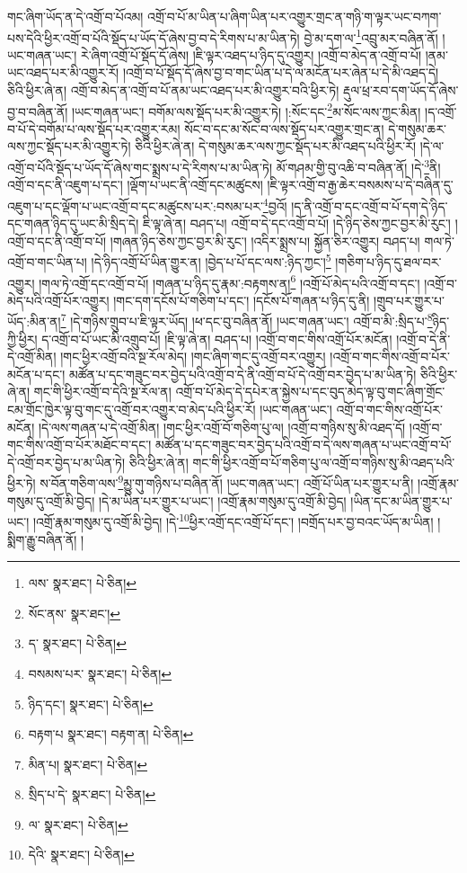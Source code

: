 གང་ཞིག་ཡོད་ན་དེ་འགྲོ་བ་པོའམ། འགྲོ་བ་པོ་མ་ཡིན་པ་ཞིག་ཡིན་པར་འགྱུར་གྲང་ན་གཉི་ག་ལྟར་ཡང་བཀག་པས་དེའི་ཕྱིར་འགྲོ་བ་པོའི་སྡོད་པ་ཡོད་དོ་ཞེས་བྱ་བ་དེ་རིགས་པ་མ་ཡིན་ཏེ། བྱེ་མ་དག་ལ་\footnote{ལས་  སྣར་ཐང་།  པེ་ཅིན། }འབྲུ་མར་བཞིན་ནོ། །ཡང་གཞན་ཡང་། རེ་ཞིག་འགྲོ་པོ་སྡོད་དོ་ཞེས། །ཇི་ལྟར་འཐད་པ་ཉིད་དུ་འགྱུར། །འགྲོ་བ་མེད་ན་འགྲོ་བ་པོ། །ནམ་ཡང་འཐད་པར་མི་འགྱུར་རོ། །འགྲོ་བ་པོ་སྡོད་དོ་ཞེས་བྱ་བ་གང་ཡིན་པ་དེ་ལ་མངོན་པར་ཞེན་པ་དེ་མི་འཐད་དེ། ཅིའི་ཕྱིར་ཞེ་ན། འགྲོ་བ་མེད་ན་འགྲོ་བ་པོ་ནམ་ཡང་འཐད་པར་མི་འགྱུར་བའི་ཕྱིར་ཏེ། རྡུལ་ཕྲ་རབ་དག་ཡོད་དོ་ཞེས་བྱ་བ་བཞིན་ནོ། །ཡང་གཞན་ཡང་། བགོམ་ལས་སྡོད་པར་མི་འགྱུར་ཏེ། །:སོང་དང་\footnote{སོང་ནས་  སྣར་ཐང་། }མ་སོང་ལས་ཀྱང་མིན། །ད་འགྲོ་བ་པོ་དེ་བགོམ་པ་ལས་སྡོད་པར་འགྱུར་རམ། སོང་བ་དང་མ་སོང་བ་ལས་སྡོད་པར་འགྱུར་གྲང་ན། དེ་གསུམ་ཆར་ལས་ཀྱང་སྡོད་པར་མི་འགྱུར་ཏེ། ཅིའི་ཕྱིར་ཞེ་ན། དེ་གསུམ་ཆར་ལས་ཀྱང་སྡོད་པར་མི་འཐད་པའི་ཕྱིར་རོ། །དེ་ལ་འགྲོ་བ་པོའི་སྡོད་པ་ཡོད་དོ་ཞེས་གང་སྨྲས་པ་དེ་རིགས་པ་མ་ཡིན་ཏེ། མོ་གཤམ་གྱི་བུ་འཆི་བ་བཞིན་ནོ། །དེ་\footnote{ད་  སྣར་ཐང་།  པེ་ཅིན། }ནི། འགྲོ་བ་དང་ནི་འཇུག་པ་དང་། །ལྡོག་པ་ཡང་ནི་འགྲོ་དང་མཚུངས། །ཇི་ལྟར་འགྲོ་བ་རྒྱ་ཆེར་བསམས་པ་དེ་བཞིན་དུ་འཇུག་པ་དང་ལྡོག་པ་ཡང་འགྲོ་བ་དང་མཚུངས་པར་:བསམ་པར་\footnote{བསམས་པར་  སྣར་ཐང་།  པེ་ཅིན། }བྱའོ། །ད་ནི་འགྲོ་བ་དང་འགྲོ་བ་པོ་དག་དེ་ཉིད་དང་གཞན་ཉིད་དུ་ཡང་མི་སྲིད་དེ། ཇི་ལྟ་ཞེ་ན། བཤད་པ། འགྲོ་བ་དེ་དང་འགྲོ་བ་པོ། །དེ་ཉིད་ཅེས་ཀྱང་བྱར་མི་རུང་། །འགྲོ་བ་དང་ནི་འགྲོ་བ་པོ། །གཞན་ཉིད་ཅེས་ཀྱང་བྱར་མི་རུང་། །འདིར་སྨྲས་པ། སྐྱོན་ཅིར་འགྱུར། བཤད་པ། གལ་ཏེ་འགྲོ་བ་གང་ཡིན་པ། །དེ་ཉིད་འགྲོ་པོ་ཡིན་གྱུར་ན། །བྱེད་པ་པོ་དང་ལས་:ཉིད་ཀྱང་།\footnote{ཉིད་དང་།  སྣར་ཐང་།  པེ་ཅིན། } །གཅིག་པ་ཉིད་དུ་ཐལ་བར་འགྱུར། །གལ་ཏེ་འགྲོ་དང་འགྲོ་བ་པོ། །གཞན་པ་ཉིད་དུ་རྣམ་:བརྟགས་ན།\footnote{བརྟག་པ  སྣར་ཐང་། བརྟག་ན།  པེ་ཅིན། } །འགྲོ་པོ་མེད་པའི་འགྲོ་བ་དང་། །འགྲོ་བ་མེད་པའི་འགྲོ་པོར་འགྱུར། །གང་དག་དངོས་པོ་གཅིག་པ་དང་། །དངོས་པོ་གཞན་པ་ཉིད་དུ་ནི། །གྲུབ་པར་གྱུར་པ་ཡོད་:མིན་ན།\footnote{མིན་པ།  སྣར་ཐང་།  པེ་ཅིན། } །དེ་གཉིས་གྲུབ་པ་ཇི་ལྟར་ཡོད། །ཕ་དང་བུ་བཞིན་ནོ། །ཡང་གཞན་ཡང་། འགྲོ་བ་མི་:སྲིད་པ་\footnote{སྲིད་པ་དེ་  སྣར་ཐང་།  པེ་ཅིན། }ཉིད་ཀྱི་ཕྱིར། ད་འགྲོ་བ་པོ་ཡང་མི་འགྲུབ་པོ། །ཇི་ལྟ་ཞེ་ན། བཤད་པ། །འགྲོ་བ་གང་གིས་འགྲོ་པོར་མངོན། །འགྲོ་བ་དེ་ནི་དེ་འགྲོ་མིན། །གང་ཕྱིར་འགྲོ་བའི་སྔ་རོལ་མེད། །གང་ཞིག་གང་དུ་འགྲོ་བར་འགྱུར། །འགྲོ་བ་གང་གིས་འགྲོ་བ་པོར་མངོན་པ་དང་། མཚོན་པ་དང་གཟུང་བར་བྱེད་པའི་འགྲོ་བ་དེ་ནི་འགྲོ་བ་པོ་དེ་འགྲོ་བར་བྱེད་པ་མ་ཡིན་ཏེ། ཅིའི་ཕྱིར་ཞེ་ན། གང་གི་ཕྱིར་འགྲོ་བ་དེའི་སྔ་རོལ་ན། འགྲོ་བ་པོ་མེད་དེ་དཔེར་ན་སྐྱེས་པ་དང་བུད་མེད་ལྟ་བུ་གང་ཞིག་གྲོང་ངམ་གྲོང་ཁྱེར་ལྟ་བུ་གང་དུ་འགྲོ་བར་འགྱུར་བ་མེད་པའི་ཕྱིར་རོ། །ཡང་གཞན་ཡང་། འགྲོ་བ་གང་གིས་འགྲོ་པོར་མངོན། །དེ་ལས་གཞན་པ་དེ་འགྲོ་མིན། །གང་ཕྱིར་འགྲོ་བོ་གཅིག་པུ་ལ། །འགྲོ་བ་གཉིས་སུ་མི་འཐད་དོ། །འགྲོ་བ་གང་གིས་འགྲོ་བ་པོར་མཐོང་བ་དང་། མཚོན་པ་དང་གཟུང་བར་བྱེད་པའི་འགྲོ་བ་དེ་ལས་གཞན་པ་ཡང་འགྲོ་བ་པོ་དེ་འགྲོ་བར་བྱེད་པ་མ་ཡིན་ཏེ། ཅིའི་ཕྱིར་ཞེ་ན། གང་གི་ཕྱིར་འགྲོ་བ་པོ་གཅིག་པུ་ལ་འགྲོ་བ་གཉིས་སུ་མི་འཐད་པའི་ཕྱིར་ཏེ། ས་བོན་གཅིག་ལས་\footnote{ལ་  སྣར་ཐང་།  པེ་ཅིན། }མྱུ་གུ་གཉིས་པ་བཞིན་ནོ། །ཡང་གཞན་ཡང་། འགྲོ་པོ་ཡིན་པར་གྱུར་པ་ནི། །འགྲོ་རྣམ་གསུམ་དུ་འགྲོ་མི་བྱེད། །དེ་མ་ཡིན་པར་གྱུར་པ་ཡང་། །འགྲོ་རྣམ་གསུམ་དུ་འགྲོ་མི་བྱེད། །ཡིན་དང་མ་ཡིན་གྱུར་པ་ཡང་། །འགྲོ་རྣམ་གསུམ་དུ་འགྲོ་མི་བྱེད། །དེ་\footnote{དེའི་  སྣར་ཐང་།  པེ་ཅིན། }ཕྱིར་འགྲོ་དང་འགྲོ་པོ་དང་། །བགྲོད་པར་བྱ་བའང་ཡོད་མ་ཡིན། །སྨིག་རྒྱུ་བཞིན་ནོ། །
